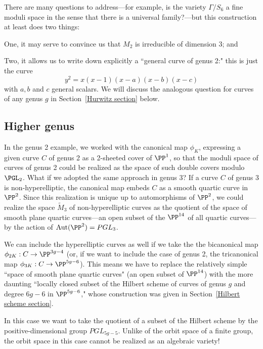 There are many questions to address---for example, is the variety $\Gamma/S_6$ a fine moduli space in the sense that there is a universal family?---but this construction at least does two things: 

One, it may serve to convince us that $M_2$ is irreducible of dimension 3; and

Two, it allows us to write down explicitly a ``general curve of genus 2:" this is just the curve
$$
y^2 = x(x-1)(x-a)(x-b)(x-c)
$$
with $a, b$ and $c$ general scalars. We will discuss the analogous question for curves of any genus $g$ in Section~\ref{Hurwitz section} below.

\subsection{Higher genus}

In the genus 2 example, we worked with the canonical map $\phi_K$, expressing a given curve $C$ of genus 2 as a 2-sheeted cover of $\PP^1$, so that the moduli space of curves of genus 2 could be realized as the space of such double covers modulo $\PGL_2$. What if we adopted the same approach in genus 3? If a curve $C$ of genus 3 is non-hyperelliptic, the canonical map embeds $C$ as a smooth quartic curve in $\PP^2$. Since this realization is unique up to automorphisms of $\PP^2$, we could realize the space $\tilde M_3$ of non-hyperelliptic curves as the quotient of the space of smooth plane quartic curves---an open subset of the $\PP^{14}$ of all quartic curves---by the action of ${\rm Aut}(\PP^2) = PGL_3$. 

We can include the hyperelliptic curves as well if we take the the bicanonical map $\phi_{2K} : C \to \PP^{3g-4}$ (or, if we want to include the case of genus 2, the tricanonical map  $\phi_{3K} : C \to \PP^{5g-6}$). This means we have to replace the relatively simple ``space of smooth plane quartic curves" (an open subset of $\PP^{14}$) with the more daunting ``locally closed subset of the Hilbert scheme of curves of genus $g$ and degree $6g-6$ in $\PP^{5g-6}$,"
 whose construction was given in Section~\ref{Hilbert scheme section}.

In this case we want to take the quotient of a subset of the Hilbert scheme by the positive-dimensional group $PGL_{5g-5}$. Unlike of the orbit space of a finite group, the orbit space in this case cannot be realized as an algebraic variety!

